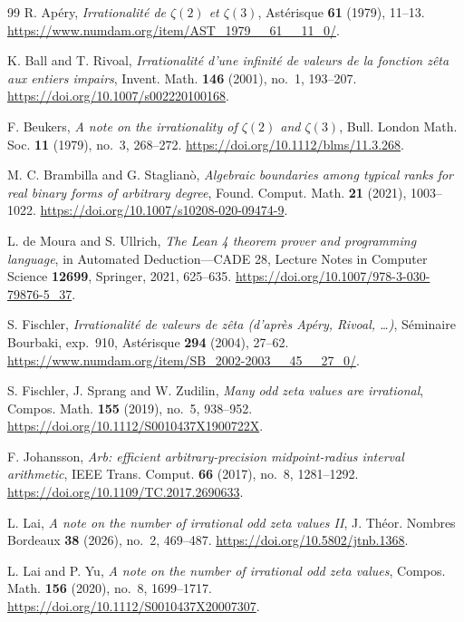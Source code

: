 \begin{thebibliography}{99}
 R. Ap\'ery,
\emph{Irrationalit\'e de $\zeta(2)$ et $\zeta(3)$},
Ast\'erisque \textbf{61} (1979), 11--13.
\url{https://www.numdam.org/item/AST_1979__61__11_0/}.

 K. Ball and T. Rivoal,
\emph{Irrationalit\'e d'une infinit\'e de valeurs de la fonction z\^eta aux entiers impairs},
Invent. Math. \textbf{146} (2001), no.~1, 193--207.
\url{https://doi.org/10.1007/s002220100168}.

 F. Beukers,
\emph{A note on the irrationality of $\zeta(2)$ and $\zeta(3)$},
Bull. London Math. Soc. \textbf{11} (1979), no.~3, 268--272.
\url{https://doi.org/10.1112/blms/11.3.268}.

 M. C. Brambilla and G. Staglian\`o,
\emph{Algebraic boundaries among typical ranks for real binary forms of arbitrary degree},
Found. Comput. Math. \textbf{21} (2021), 1003--1022.
\url{https://doi.org/10.1007/s10208-020-09474-9}.

 L. de Moura and S. Ullrich,
\emph{The Lean 4 theorem prover and programming language},
in Automated Deduction---CADE 28, Lecture Notes in Computer Science
\textbf{12699}, Springer, 2021, 625--635.
\url{https://doi.org/10.1007/978-3-030-79876-5_37}.

 S. Fischler,
\emph{Irrationalit\'e de valeurs de z\^eta (d'apr\`es Ap\'ery, Rivoal, \ldots)},
S\'eminaire Bourbaki, exp.~910, Ast\'erisque \textbf{294} (2004), 27--62.
\url{https://www.numdam.org/item/SB_2002-2003__45__27_0/}.

 S. Fischler, J. Sprang and W. Zudilin,
\emph{Many odd zeta values are irrational},
Compos. Math. \textbf{155} (2019), no.~5, 938--952.
\url{https://doi.org/10.1112/S0010437X1900722X}.

 F. Johansson,
\emph{Arb: efficient arbitrary-precision midpoint-radius interval arithmetic},
IEEE Trans. Comput. \textbf{66} (2017), no.~8, 1281--1292.
\url{https://doi.org/10.1109/TC.2017.2690633}.

 L. Lai,
\emph{A note on the number of irrational odd zeta values II},
J. Th\'eor. Nombres Bordeaux \textbf{38} (2026), no.~2, 469--487.
\url{https://doi.org/10.5802/jtnb.1368}.

 L. Lai and P. Yu,
\emph{A note on the number of irrational odd zeta values},
Compos. Math. \textbf{156} (2020), no.~8, 1699--1717.
\url{https://doi.org/10.1112/S0010437X20007307}.


\end{thebibliography}
